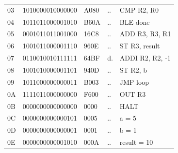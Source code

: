 \begin{tcolorbox}[stepbox, title={Instruction 20 \hfill ticks 58 to 60 \quad ADD R3, R3, R1}]
{\begin{tabular}{@{}lllll@{}}
03 & 1010000010000000 & A080 & .. & CMP R2, R0\\
04 & 1011011000001010 & B60A & .. & BLE done\\
05 & 0001011011001000 & 16C8 & .. & ADD R3, R3, R1\\
\rowcolor{pcc}06 & 1001011000001110 & 960E & .. & ST R3, result\\
07 & 0110010010111111 & 64BF & d. & ADDI R2, R2, -1\\
08 & 1001010000001101 & 940D & .. & ST R2, b\\
09 & 1011000000000011 & B003 & .. & JMP loop\\
0A & 1111011000000000 & F600 & .. & OUT R3\\
0B & 0000000000000000 & 0000 & .. & HALT\\
\rowcolor{datac}0C & 0000000000000101 & 0005 & .. & a = 5\\
\rowcolor{datac}0D & 0000000000000001 & 0001 & .. & b = 1\\
\rowcolor{datac}0E & 0000000000001010 & 000A & .. & result = 10\\
\end{tabular}}
\end{tcolorbox}\par\vspace{3pt}

